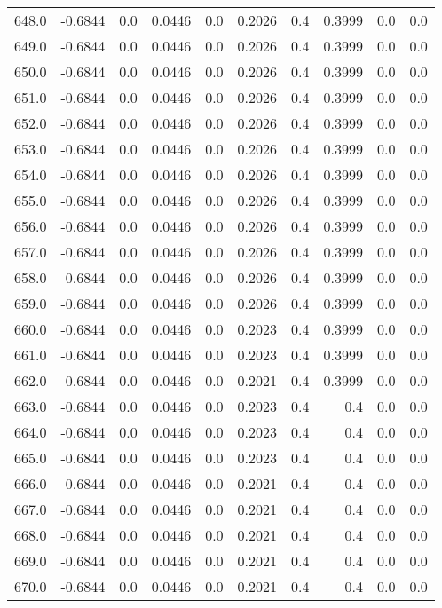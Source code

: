 \begin{longtable}{lrrrrrrrrr}
648.0 & -0.6844 & 0.0 & 0.0446 & 0.0 & 0.2026 & 0.4 & 0.3999 & 0.0 & 0.0 \\
649.0 & -0.6844 & 0.0 & 0.0446 & 0.0 & 0.2026 & 0.4 & 0.3999 & 0.0 & 0.0 \\
650.0 & -0.6844 & 0.0 & 0.0446 & 0.0 & 0.2026 & 0.4 & 0.3999 & 0.0 & 0.0 \\
651.0 & -0.6844 & 0.0 & 0.0446 & 0.0 & 0.2026 & 0.4 & 0.3999 & 0.0 & 0.0 \\
652.0 & -0.6844 & 0.0 & 0.0446 & 0.0 & 0.2026 & 0.4 & 0.3999 & 0.0 & 0.0 \\
653.0 & -0.6844 & 0.0 & 0.0446 & 0.0 & 0.2026 & 0.4 & 0.3999 & 0.0 & 0.0 \\
654.0 & -0.6844 & 0.0 & 0.0446 & 0.0 & 0.2026 & 0.4 & 0.3999 & 0.0 & 0.0 \\
655.0 & -0.6844 & 0.0 & 0.0446 & 0.0 & 0.2026 & 0.4 & 0.3999 & 0.0 & 0.0 \\
656.0 & -0.6844 & 0.0 & 0.0446 & 0.0 & 0.2026 & 0.4 & 0.3999 & 0.0 & 0.0 \\
657.0 & -0.6844 & 0.0 & 0.0446 & 0.0 & 0.2026 & 0.4 & 0.3999 & 0.0 & 0.0 \\
658.0 & -0.6844 & 0.0 & 0.0446 & 0.0 & 0.2026 & 0.4 & 0.3999 & 0.0 & 0.0 \\
659.0 & -0.6844 & 0.0 & 0.0446 & 0.0 & 0.2026 & 0.4 & 0.3999 & 0.0 & 0.0 \\
660.0 & -0.6844 & 0.0 & 0.0446 & 0.0 & 0.2023 & 0.4 & 0.3999 & 0.0 & 0.0 \\
661.0 & -0.6844 & 0.0 & 0.0446 & 0.0 & 0.2023 & 0.4 & 0.3999 & 0.0 & 0.0 \\
662.0 & -0.6844 & 0.0 & 0.0446 & 0.0 & 0.2021 & 0.4 & 0.3999 & 0.0 & 0.0 \\
663.0 & -0.6844 & 0.0 & 0.0446 & 0.0 & 0.2023 & 0.4 & 0.4 & 0.0 & 0.0 \\
664.0 & -0.6844 & 0.0 & 0.0446 & 0.0 & 0.2023 & 0.4 & 0.4 & 0.0 & 0.0 \\
665.0 & -0.6844 & 0.0 & 0.0446 & 0.0 & 0.2023 & 0.4 & 0.4 & 0.0 & 0.0 \\
666.0 & -0.6844 & 0.0 & 0.0446 & 0.0 & 0.2021 & 0.4 & 0.4 & 0.0 & 0.0 \\
667.0 & -0.6844 & 0.0 & 0.0446 & 0.0 & 0.2021 & 0.4 & 0.4 & 0.0 & 0.0 \\
668.0 & -0.6844 & 0.0 & 0.0446 & 0.0 & 0.2021 & 0.4 & 0.4 & 0.0 & 0.0 \\
669.0 & -0.6844 & 0.0 & 0.0446 & 0.0 & 0.2021 & 0.4 & 0.4 & 0.0 & 0.0 \\
670.0 & -0.6844 & 0.0 & 0.0446 & 0.0 & 0.2021 & 0.4 & 0.4 & 0.0 & 0.0 \\

\end{longtable}

